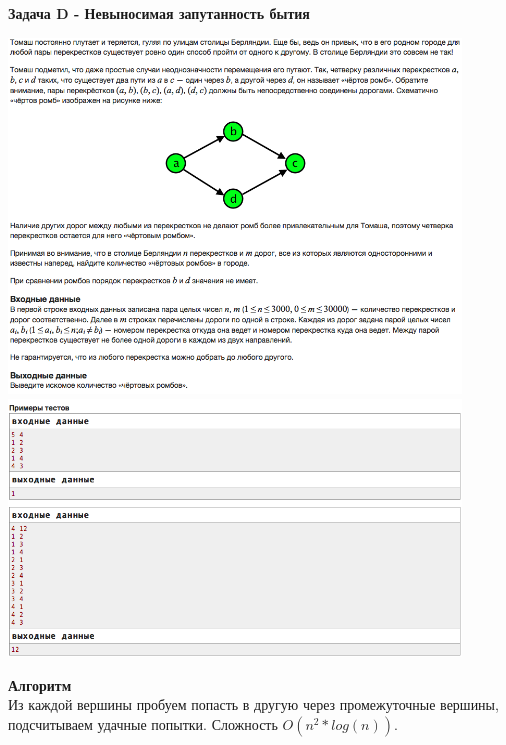 \documentclass[a4paper,12pt]{article}
\begin{document}
\newpage
\textbf{{\large Задача D - Невыносимая запутанность бытия}} \\
\begin{center}
\includegraphics[width=0.9\textwidth]{C_277_5/C_277_5_D1.png}\\
\includegraphics[width=0.9\textwidth]{C_277_5/C_277_5_D2.png}\\ [1cm]
\end{center}
\textbf{{\large Алгоритм}} \\
Из каждой вершины пробуем попасть в другую через промежуточные вершины, подсчитываем удачные попытки. Сложность $O(n^2*log(n))$. \\
\end{document}
